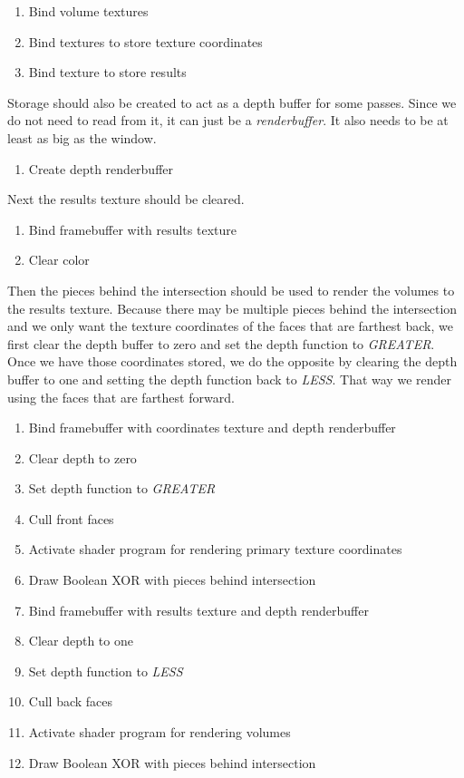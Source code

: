 \documentclass{article}
\begin{document}
\begin{enumerate}
  \item Bind volume textures
  \item Bind textures to store texture coordinates
  \item Bind texture to store results
\end{enumerate}

Storage should also be created to act as a depth buffer for some passes.  Since
we do not need to read from it, it can just be a \emph{renderbuffer}.  It also
needs to be at least as big as the window.

\begin{enumerate}
  \item Create depth renderbuffer
\end{enumerate}

Next the results texture should be cleared.

\begin{enumerate}
  \item Bind framebuffer with results texture
  \item Clear color
\end{enumerate}

Then the pieces behind the intersection should be used to render the volumes to
the results texture.  Because there may be multiple pieces behind the
intersection and we only want the texture coordinates of the faces that are
farthest back, we first clear the depth buffer to zero and set the depth
function to \emph{GREATER}.  Once we have those coordinates stored, we do the
opposite by clearing the depth buffer to one and setting the depth function back
to \emph{LESS}.  That way we render using the faces that are farthest forward.

\begin{enumerate}
  \item Bind framebuffer with coordinates texture and depth renderbuffer
  \item Clear depth to zero
  \item Set depth function to \emph{GREATER}
  \item Cull front faces
  \item Activate shader program for rendering primary texture coordinates
  \item Draw Boolean XOR with pieces behind intersection
  \item Bind framebuffer with results texture and depth renderbuffer
  \item Clear depth to one
  \item Set depth function to \emph{LESS}
  \item Cull back faces
  \item Activate shader program for rendering volumes
  \item Draw Boolean XOR with pieces behind intersection
\end{enumerate}
\end{document}
